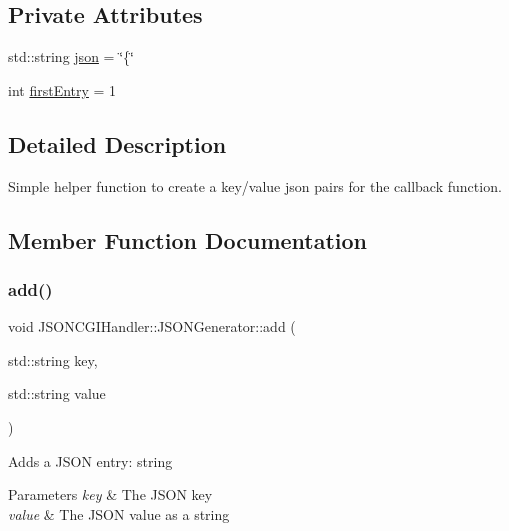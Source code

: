 \subsection*{Private Attributes}
\begin{DoxyCompactItemize}
\item 
std\+::string \hyperlink{classJSONCGIHandler_1_1JSONGenerator_a5a9fd42e7b9030c6a0a4bee923a2e416}{json} = \char`\"{}\{\char`\"{}
\item 
int \hyperlink{classJSONCGIHandler_1_1JSONGenerator_a9d14c80af92fa9f3a3406d826acd2cc0}{first\+Entry} = 1
\end{DoxyCompactItemize}


\subsection{Detailed Description}
Simple helper function to create a key/value json pairs for the callback function. 

\subsection{Member Function Documentation}
\mbox{\label{classJSONCGIHandler_1_1JSONGenerator_a191efd00967cbace0d9ddfedea39cd9b}} 
\subsubsection{\texorpdfstring{add()}{add()}\hspace{0.1cm}{\footnotesize\ttfamily [1/5]}}
{\footnotesize\ttfamily void J\+S\+O\+N\+C\+G\+I\+Handler\+::\+J\+S\+O\+N\+Generator\+::add (\begin{DoxyParamCaption}\item[{std\+::string}]{key,  }\item[{std\+::string}]{value }\end{DoxyParamCaption})\hspace{0.3cm}{\ttfamily [inline]}}

Adds a J\+S\+ON entry\+: string 
\begin{DoxyParams}{Parameters}
{\em key} & The J\+S\+ON key \\
\hline
{\em value} & The J\+S\+ON value as a string \\
\hline
\end{DoxyParams}
\mbox{\label{classJSONCGIHandler_1_1JSONGenerator_aa25099deb2442335298ab1c021f36910}} 
